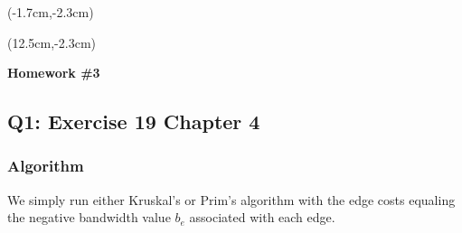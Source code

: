 \documentclass[12pt, oneside]{article}
\begin{document}
\begin{textblock*}{4cm}(-1.7cm,-2.3cm)
\end{textblock*}

\begin{textblock*}{8cm}(12.5cm,-2.3cm)
\end{textblock*}


\vspace{1cm}

\makeatletter
\setlength{\@fptop}{0pt}
\makeatother

\begin{center}
\textbf{\Large Homework \#3}
\end{center}


\subsection*{Q1: Exercise 19 Chapter 4}
\subsubsection*{Algorithm}
We simply run either Kruskal's or Prim's algorithm with the edge costs equaling the negative bandwidth value $b_e$ associated with each edge.\\
\end{document}
